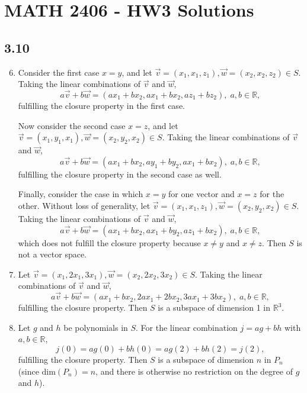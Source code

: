 \documentclass[a4paper,12pt]{article}
\begin{document}
	
	\section*{MATH 2406 - HW3 Solutions}
	
	\subsection*{3.10}
	\begin{enumerate}
		\setcounter{enumi}{5}
		\item Consider the first case $x = y$, and let $\vec{v} = (x_1, x_1, z_1), \vec{w} = (x_2, x_2, z_2) \in S$. Taking the linear combinations of $\vec{v}$ and $\vec{w}$,
		\[ a\vec{v} + b\vec{w} = (ax_1 + bx_2, ax_1 + bx_2, az_1 + bz_2), \; a, b \in \mathbb{R}, \]
		fulfilling the closure property in the first case.\par
		Now consider the second case $x = z$, and let $\vec{v} = (x_1, y_1, x_1), \vec{w} = (x_2, y_2, x_2) \in S$. Taking the linear combinations of $\vec{v}$ and $\vec{w}$,
		\[ a\vec{v} + b\vec{w} = (ax_1 + bx_2, ay_1 + by_2, ax_1 + bx_2), \; a, b \in \mathbb{R}, \]
		fulfilling the closure property in the second case as well.\par
		Finally, consider the case in which $x = y$ for one vector and $x = z$ for the other. Without loss of generality, let $\vec{v} = (x_1, x_1, z_1), \vec{w} = (x_2, y_2, x_2) \in S$. Taking the linear combinations of $\vec{v}$ and $\vec{w}$,
		\[ a\vec{v} + b\vec{w} = (ax_1 + bx_2, ax_1 + by_2, az_1 + bx_2), \; a, b \in \mathbb{R}, \]
		which does not fulfill the closure property because $x \neq y$ and $x \neq z$. Then $S$ is not a vector space.
		
		\setcounter{enumi}{8}
		\item Let $\vec{v} = (x_1, 2x_1, 3x_1), \vec{w} = (x_2, 2x_2, 3x_2) \in S$. Taking the linear combinations of $\vec{v}$ and $\vec{w}$,
		\[ a\vec{v} + b\vec{w} = (ax_1 + bx_2, 2ax_1 + 2bx_2, 3ax_1 + 3bx_2), \; a, b \in \mathbb{R}, \]
		fulfilling the closure property. Then $S$ is a subspace of dimension 1 in $\mathbb{R}^3$.
		
		\setcounter{enumi}{11}
		\item Let $g$ and $h$ be polynomials in $S$. For the linear combination $j = ag + bh$ with $a, b \in \mathbb{R}$,
		\[ j(0) = ag(0) + bh(0) = ag(2) + bh(2) = j(2), \]
		fulfilling the closure property. Then $S$ is a subspace of dimension $n$ in $P_n$ (since $\mbox{dim}(P_n) = n$, and there is otherwise no restriction on the degree of $g$ and $h$).
		

\end{enumerate}
\end{document}
